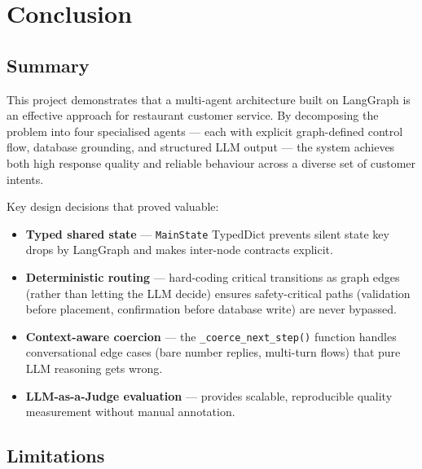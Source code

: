 \documentclass[12pt,a4paper]{report}
\begin{document}
\chapter{Conclusion}\label{ch:conclusion}

\section{Summary}

This project demonstrates that a multi-agent architecture built on LangGraph is an
effective approach for restaurant customer service. By decomposing the problem into
four specialised agents — each with explicit graph-defined control flow, database
grounding, and structured LLM output — the system achieves both high response quality
and reliable behaviour across a diverse set of customer intents.

Key design decisions that proved valuable:

\begin{itemize}
    \item \textbf{Typed shared state} — \texttt{MainState} TypedDict prevents silent
          state key drops by LangGraph and makes inter-node contracts explicit.
    \item \textbf{Deterministic routing} — hard-coding critical transitions as graph
          edges (rather than letting the LLM decide) ensures safety-critical paths
          (validation before placement, confirmation before database write) are
          never bypassed.
    \item \textbf{Context-aware coercion} — the \texttt{\_coerce\_next\_step()} function
          handles conversational edge cases (bare number replies, multi-turn flows)
          that pure LLM reasoning gets wrong.
    \item \textbf{LLM-as-a-Judge evaluation} — provides scalable, reproducible
          quality measurement without manual annotation.
\end{itemize}

\section{Limitations}
\end{document}

